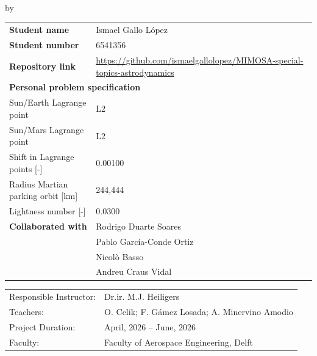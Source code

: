 \begin{titlepage}

\begin{center}

{\makeatletter
\largetitlestyle\fontsize{45}{45}\selectfont\@title
\makeatother}

{\makeatletter
\ifdefvoid{\@subtitle}{}{\bigskip\titlestyle\fontsize{20}{20}\selectfont\@subtitle}
\makeatother}

\bigskip
\bigskip

by

\bigskip
\bigskip

{\makeatletter
\largetitlestyle\fontsize{25}{25}\selectfont\@author
\makeatother}

\bigskip
\bigskip

\setlength\extrarowheight{4pt}
\begin{tabular}{ll}
    \textbf{Student name}   & Ismael Gallo López \\
    \textbf{Student number} & 6541356 \\
    \textbf{Repository link} & \url{https://github.com/ismaelgallolopez/MIMOSA-special-topics-astrodynamics}\\\midrule
    \multicolumn{2}{l}{\textbf{Personal problem specification}} \\[2pt]
    Sun/Earth Lagrange point            & L2 \\
    Sun/Mars Lagrange point             & L2 \\
    Shift in Lagrange points {[-]}      & 0.00100 \\
    Radius Martian parking orbit {[km]} & 244{,}444 \\
    Lightness number {[-]}              & 0.0300 \\\midrule
    \textbf{Collaborated with} & Rodrigo Duarte Soares \\
     & Pablo García-Conde Ortiz \\
     & Nicolò Basso \\
     & Andreu Craus Vidal \\
\end{tabular}

\vfill

\begin{tabular}{ll}
    Responsible Instructor:       & Dr.ir. M.J. Heiligers \\
    Teachers: & O. Celik; F. Gámez Losada; A. Minervino Amodio \\
    Project Duration: & April, 2026 -- June, 2026 \\
    Faculty:          & Faculty of Aerospace Engineering, Delft
\end{tabular}


\end{center}
\end{titlepage}
